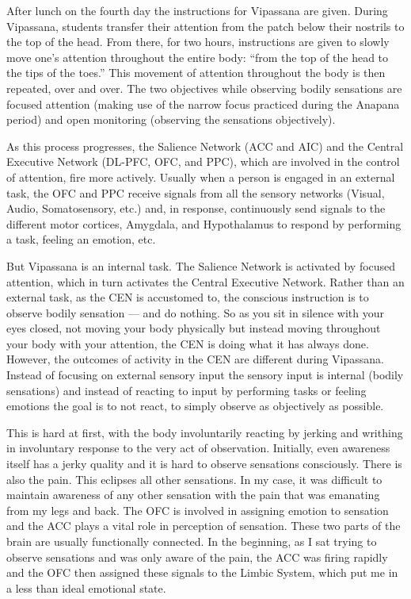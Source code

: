 \documentclass[a4paper, amsfonts, amssymb, amsmath, reprint, showkeys, nofootinbib, twoside]{revtex4-1}
\begin{document}
After lunch on the fourth day the instructions for Vipassana are given. During
Vipassana, students transfer their attention from the patch below their nostrils to the top
of the head. From there, for two hours, instructions are given to slowly move
one's attention throughout the entire body: ``from the top of the head to the tips of
the toes.'' This movement of attention throughout the body is then repeated, over and
over. The two objectives while observing bodily sensations are focused attention (making
use of the narrow focus practiced during the Anapana period) and open monitoring
(observing the sensations objectively).

As this process progresses, the Salience Network (ACC and AIC) and the Central Executive Network (DL-PFC, OFC,
and PPC), which are involved in the control of attention, fire more actively. Usually
when a person is engaged in an external task, the OFC and PPC receive signals
from all the sensory networks (Visual, Audio, Somatosensory, etc.) and, in response,
continuously send signals to the different motor cortices, Amygdala, and Hypothalamus to
respond by performing a task, feeling an emotion, etc.

But Vipassana is an internal task. The Salience Network is activated by focused
attention, which in turn activates the Central Executive Network. Rather than an
external task, as the CEN is accustomed to, the conscious instruction is to observe
bodily sensation --- and do nothing. So as you sit in silence with your eyes closed,
not moving your body physically but instead moving throughout your body with your
attention, the CEN is doing what it has always done. However, the outcomes of
activity in the CEN are different during Vipassana. Instead of focusing on
external sensory input the sensory input is internal (bodily sensations) and instead
of reacting to input by performing tasks or feeling emotions the goal is to not
react, to simply observe as objectively as possible.

This is hard at first, with the body involuntarily reacting by jerking and writhing
in involuntary response to the very act of observation. Initially, even awareness
itself has a jerky quality and it is hard to observe sensations consciously. There is also the
pain. This eclipses all other sensations. In my case, it was difficult to maintain
awareness of any other sensation with the pain that was emanating from my legs and
back. The OFC is involved in assigning emotion to sensation \cite{ofcemotion} and the
ACC plays a vital role in perception of sensation. These two parts of the brain are
usually functionally connected. In the beginning, as I sat trying to observe
sensations and was only aware of the pain, the ACC was firing rapidly and the
OFC then assigned these signals to the Limbic System, which
put me in a less than ideal emotional state.
\end{document}
